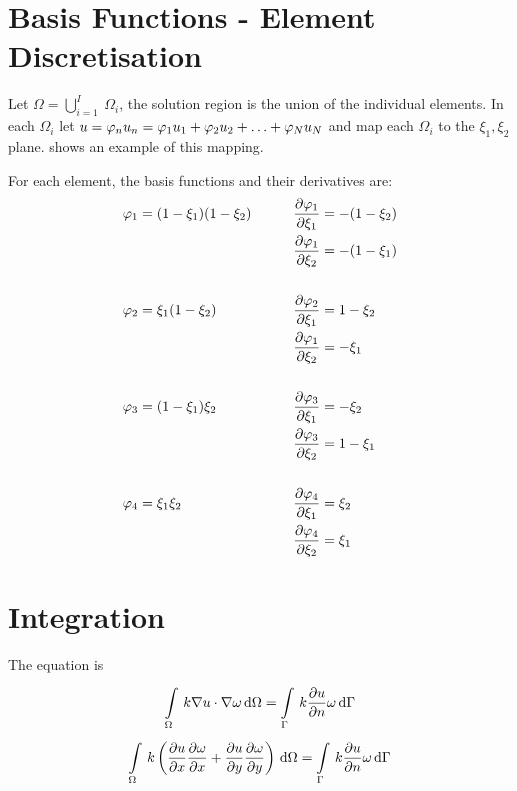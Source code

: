 

\section{Basis Functions - Element Discretisation}

Let $\Omega = \displaystyle{\bigcup^{I}_{i=1}} \medspace \Omega_{i}$, \ie the
solution region is the union of the individual elements. In each $\Omega_{i}$ let $u =
 \varphi_{n} u_{n} =  \varphi_{1} u_{1} +  \varphi_{2} u_{2} + \ldots + 
 \varphi_{N} u_{N}$ and map each $\Omega_{i}$ to the $\xi_{1}, \xi_{2}$
plane.  shows an example of this mapping. 

For each element, the basis functions and their derivatives are:
\begin{alignat}{2}
   \varphi_{1}  &= (1-\xi_{1})(1-\xi_{2})  
  &\qquad  \dfrac{\partial  \varphi_{1} }{\partial \xi_{1}} &=-(1-\xi_{2})\\ 
  && \dfrac{\partial  \varphi_{1} }{\partial \xi_{2}} 
  &=-(1-\xi_{1})\\\\
   \varphi_{2} &=\xi_{1}(1-\xi_{2}) &\quad  \dfrac{\partial  \varphi_{2} }{\partial \xi_{1}} &=1-\xi_{2}\\ 
  && \dfrac{\partial  \varphi_{1} }{\partial \xi_{2}} &=-\xi_{1} \\\\ 
   \varphi_{3} &=(1-\xi_{1})\xi_{2} &\quad  \dfrac{\partial  \varphi_{3} }{\partial \xi_{1}} &=-\xi_{2}\\ 
  && \dfrac{\partial  \varphi_{3} }{\partial \xi_{2}} &=1-\xi_{1} \\\\  
   \varphi_{4} &=\xi_{1}\xi_{2} &\quad  \dfrac{\partial  \varphi_{4} }{\partial \xi_{1}} &=\xi_{2}\\ 
  && \dfrac{\partial  \varphi_{4} }{\partial \xi_{2}} &=\xi_{1} 
\end{alignat}

\section{Integration}

The equation is 
\begin{equation}
  \goneint{k\dotprod{\gradient{}{u}}{\gradient{}{\omega}}}{\Omega} 
     = \goneint{k\delby{u}{n}\omega}{\Gamma}
\end{equation}
\ie
\begin{equation}
  \goneint{k\pbrac{\delby{u}{x}\delby{\omega}{x} + 
    \delby{u}{y}\delby{\omega}{y}}}{\Omega} = \goneint{k\delby{u}{n}\omega}{\Gamma}
\end{equation}


